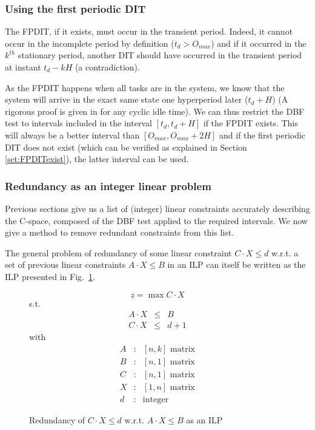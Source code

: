 \documentclass[conference]{IEEEtran}
\begin{document}
\subsubsection{Using the first periodic DIT}

The FPDIT, if it exists, must occur in the transient period. Indeed, it cannot occur in the incomplete period by definition ($t_d > O_{max}$) and if it occurred in the $k^{th}$ stationary period, another DIT should have occurred in the transient period at instant $t_d - k H$ (a contradiction).

As the FPDIT happens when all tasks are in the system, we know that the system will arrive in the exact same state one hyperperiod later ($t_d + H$) (A rigorous proof is given in \cite{choquet2004minimal} for any cyclic idle time). We can thus restrict the DBF test to intervals included in the interval $[t_d, t_d + H]$ if the FPDIT exists. This will always be a better interval than $[O_{max}, O_{max} + 2H]$ and if the first periodic DIT does not exist (which can be verified as explained in Section \ref{sct:FPDITexist}), the latter interval can be used.

\subsubsection{Redundancy as an integer linear problem}

Previous sections give us a list of (integer) linear constraints accurately describing the C-space, composed of the DBF test applied to the required intervals. We now give a method to remove redundant constraints from this list.

The general problem of redundancy of some linear constraint $C \cdot X \leq d$
w.r.t. a set of previous linear constraints $A \cdot X \leq B$ in an ILP can
itself be written as the ILP presented in Fig.~\ref{fig:redILP}.

\begin{figure}[h]
$$z = \max C \cdot X$$
s.t.
\[
\begin{array}{rcc}
  A \cdot X &\leq & B \\
  C \cdot X &\leq & d + 1
\end{array}
\]
with
\[
  \begin{array}{ccc}
    A & : & [n,k] \text{ matrix}\\
    B & : & [n,1] \text{ matrix}\\
    C & : & [n,1] \text{ matrix}\\
    X & : & [1,n] \text{ matrix}\\
    d & : & \text{integer}
  \end{array}
\]
\caption{Redundancy of $C \cdot X \leq d$ w.r.t. $A \cdot X \leq B$ as an ILP}
\label{fig:redILP}
\end{figure}
\end{document}
